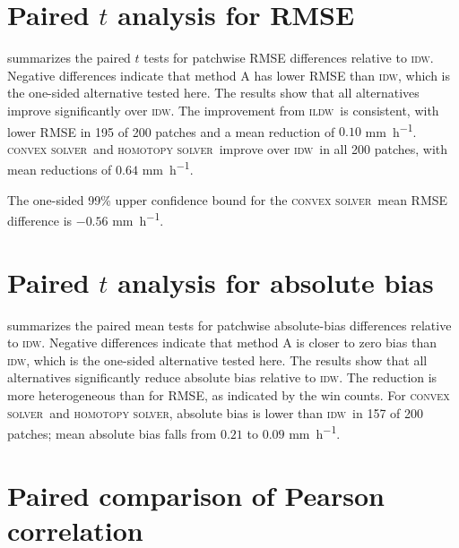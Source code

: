 \documentclass[a4paper,fleqn]{cas-sc}
\DeclareRobustCommand{\IDW}{\textsc{idw}}
\DeclareRobustCommand{\ILDW}{\textsc{ildw}}
\DeclareRobustCommand{\solverConvex}{\textsc{convex solver}}
\DeclareRobustCommand{\solverHomotopy}{\textsc{homotopy solver}}
\DeclareRobustCommand{\ConvexSolver}{\solverConvex}
\DeclareRobustCommand{\Homotopy}{\solverHomotopy}
\begin{document}



\section*{Paired $t$ analysis for RMSE}
 summarizes the paired $t$ tests for patchwise RMSE differences relative to \IDW. Negative differences indicate that method A has lower RMSE than \IDW, which is the one-sided alternative tested here. The results show that all alternatives improve significantly over \IDW. The improvement from \ILDW\ is consistent, with lower RMSE in 195 of 200 patches and a mean reduction of $0.10$ \si{\milli\meter\per\hour}. \ConvexSolver\ and \Homotopy\ improve over \IDW\ in all 200 patches, with mean reductions of $0.64$ \si{\milli\meter\per\hour}.

The one-sided 99\% upper confidence bound for the \ConvexSolver\ mean RMSE difference is $-0.56$ \si{\milli\meter\per\hour}.




\section*{Paired $t$ analysis for absolute bias}

 summarizes the paired mean tests for patchwise absolute-bias differences relative to \IDW. Negative differences indicate that method A is closer to zero bias than \IDW, which is the one-sided alternative tested here. The results show that all alternatives significantly reduce absolute bias relative to \IDW. The reduction is more heterogeneous than for RMSE, as indicated by the win counts. For \ConvexSolver\ and \Homotopy, absolute bias is lower than \IDW\ in 157 of 200 patches; mean absolute bias falls from $0.21$ to $0.09$ \si{\milli\meter\per\hour}.



\section*{Paired comparison of Pearson correlation}
\end{document}
